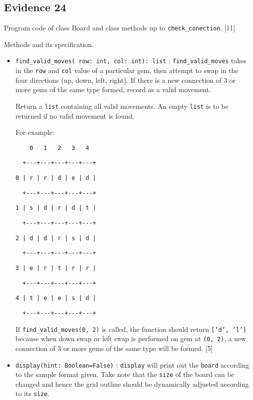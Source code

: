 \subsection*{Evidence 24 }

Program code of class Board and class methods up to \texttt{check\_conection}.
{[}11{]} 

Methods and its specification.
\begin{itemize}
\item \texttt{find\_valid\_moves( row: int, col: int): list} : \texttt{find\_valid\_moves}
takes in the \texttt{row} and \texttt{col} value of a particular gem,
then attempt to swap in the four directions (up, down, left, right).
If there is a new connection of 3 or more gems of the same type formed,
record as a valid movement. 

Return a \texttt{list} containing all valid movements. An empty \texttt{list}
is to be returned if no valid movement is found. 

For example:

\noindent %
\noindent\begin{minipage}[t]{1\columnwidth}%
\texttt{~~~~0~~~1~~~2~~~3~~~4 }

\texttt{~~+-{}-{}-+-{}-{}-+-{}-{}-+-{}-{}-+-{}-{}-+ }

\texttt{0 | r | r | d | e | d | }

\texttt{~~+-{}-{}-+-{}-{}-+-{}-{}-+-{}-{}-+-{}-{}-+ }

\texttt{1 | s | d | r | d | t | }

\texttt{~~+-{}-{}-+-{}-{}-+-{}-{}-+-{}-{}-+-{}-{}-+ }

\texttt{2 | d | d | r | s | d | }

\texttt{~~+-{}-{}-+-{}-{}-+-{}-{}-+-{}-{}-+-{}-{}-+ }

\texttt{3 | e | r | t | r | r | }

\texttt{~~+-{}-{}-+-{}-{}-+-{}-{}-+-{}-{}-+-{}-{}-+ }

\texttt{4 | t | e | e | s | d | }

\texttt{~~+-{}-{}-+-{}-{}-+-{}-{}-+-{}-{}-+-{}-{}-+ }%
\end{minipage}

If \texttt{find\_valid\_moves(0, 2)} is called, the function should
return \texttt{{[}'d', 'l'{]}} because when down swap or left swap
is performed on gem at \texttt{(0, 2)}, a new connection of 3 or more
gems of the same type will be formed. {[}5{]}
\item \texttt{display(hint: Boolean=False)} : \texttt{display} will print
out the \texttt{board} according to the sample format given. Take
note that the \texttt{size} of the board can be changed and hence
the grid outline should be dynamically adjusted according to its \texttt{size}. 


\end{itemize}
